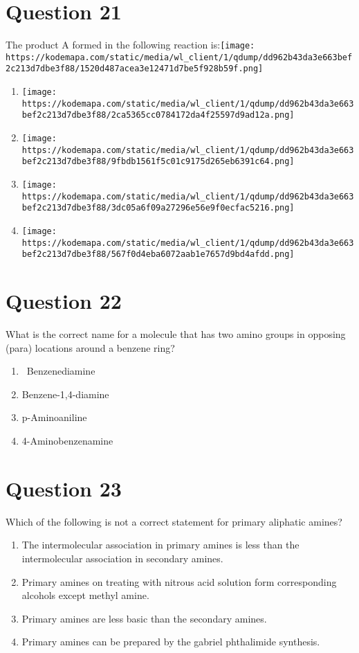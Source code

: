 \documentclass{article}
\begin{document}
\section*{Question 21}
The product A formed in the following reaction is:\texttt{[image: https://kodemapa.com/static/media/wl\_client/1/qdump/dd962b43da3e663bef2c213d7dbe3f88/1520d487acea3e12471d7be5f928b59f.png]}\newline\newline
\begin{enumerate}[label=(\alph*)]
\item \texttt{[image: https://kodemapa.com/static/media/wl\_client/1/qdump/dd962b43da3e663bef2c213d7dbe3f88/2ca5365cc0784172da4f25597d9ad12a.png]}
\item \texttt{[image: https://kodemapa.com/static/media/wl\_client/1/qdump/dd962b43da3e663bef2c213d7dbe3f88/9fbdb1561f5c01c9175d265eb6391c64.png]}
\item \texttt{[image: https://kodemapa.com/static/media/wl\_client/1/qdump/dd962b43da3e663bef2c213d7dbe3f88/3dc05a6f09a27296e56e9f0ecfac5216.png]}
\item \texttt{[image: https://kodemapa.com/static/media/wl\_client/1/qdump/dd962b43da3e663bef2c213d7dbe3f88/567f0d4eba6072aab1e7657d9bd4afdd.png]}
\end{enumerate}
\newpage
\section*{Question 22}
What is the correct name for a molecule that has two amino groups in opposing (para) locations around a benzene ring?
\begin{enumerate}[label=(\alph*)]
\item  Benzenediamine
\item Benzene-1,4-diamine
\item p-Aminoaniline
\item 4-Aminobenzenamine
\end{enumerate}
\newpage
\section*{Question 23}
Which of the following is not a correct statement for primary aliphatic amines? 
\begin{enumerate}[label=(\alph*)]
\item The intermolecular association in primary amines is less than the intermolecular association in secondary amines.
\item Primary amines on treating with nitrous acid solution form corresponding alcohols except methyl amine.
\item Primary amines are less basic than the secondary amines.
\item Primary amines can be prepared by the gabriel phthalimide synthesis.
\end{enumerate}
\newpage
\end{document}
